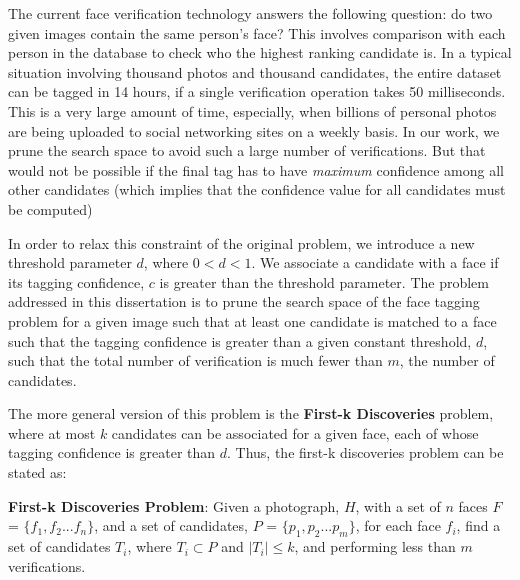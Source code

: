 The current face verification technology \cite{nk_attribute_classifiers} answers the following question: do two given images contain the same person's face? This involves comparison with each person in the database to check who the highest ranking candidate is. In a typical situation involving thousand photos and thousand candidates, the entire dataset can be tagged in 14 hours, if a single verification operation takes 50 milliseconds. This is a very large amount of time, especially, when billions of personal photos are being uploaded to social networking sites on a weekly basis. In our work, we prune the search space to avoid such a large number of verifications. But that would not be possible if the final tag has to have \textit{maximum} confidence among all other candidates (which implies that the confidence value for all candidates must be computed)

In order to relax this constraint of the original problem, we introduce a new threshold parameter $d$, where $0 < d < 1$. We associate a candidate with a face if its tagging confidence, $c$ is greater than the threshold parameter. The problem addressed in this dissertation is to prune the search space of the face tagging problem for a given image such that at least one candidate is matched to a face such that the tagging confidence is greater than a given constant threshold, $d$, such that the total number of verification is much fewer than $m$, the number of candidates. 

The more general version of this problem is the \textbf{First-k Discoveries} problem, where at most $k$ candidates can be associated for a given face, each of whose tagging confidence is greater than $d$. Thus, the first-k discoveries problem can be stated as:

\textbf{First-k Discoveries Problem}: Given a photograph, $H$, with a set of $n$ faces $F$ = $\{f_1, f_2 ... f_n\}$, and a set of candidates, $P$ = $\{p_1, p_2... p_m\}$, for each face $f_i$, find a set of candidates $T_i$, where $T_i \subset P$ and $|T_i| \leq k$, and performing less than $m$ verifications.

